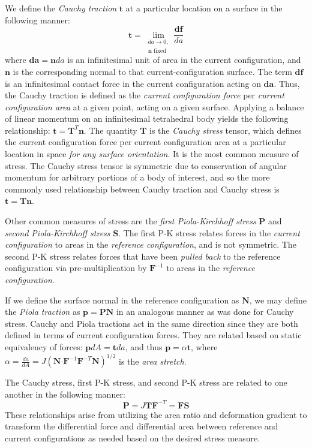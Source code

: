 We define the \textit{Cauchy traction} $\bm{t}$ at a particular location on a surface in the following manner:
\begin{equation}
\bm{t} = \lim_{\substack{{da} \rightarrow 0, \\ {\bm{n} \text{\ fixed}}}} \frac{{\bm{df}}}{da}
\end{equation}
where $\bm{da} = \bm{n}da$ is an infinitesimal unit of area in the current configuration, and $\bm{n}$ is the corresponding normal to that current-configuration surface. The term $\bm{df}$ is an infinitesimal contact force in the current configuration acting on $\bm{da}$. Thus, the Cauchy traction is defined as the \textit{current configuration force} per \textit{current configuration area} at a given point, acting on a given surface. Applying a balance of linear momentum on an infinitesimal tetrahedral body yields the following relationship: $\bm{t} = \bm{T}^T\bm{n}$. The quantity $\bm{T}$ is the \textit{Cauchy stress} tensor, which defines the current configuration force per current configuration area at a particular location in space \textit{for any surface orientation}. It is the most common measure of stress. The Cauchy stress tensor is symmetric due to conservation of angular momentum for arbitrary portions of a body of interest, and so the more commonly used relationship between Cauchy traction and Cauchy stress is $\bm{t} = \bm{T}\bm{n}$.

Other common measures of stress are the \textit{first Piola-Kirchhoff stress} $\bm{P}$ and \textit{second Piola-Kirchhoff stress} $\bm{S}$. The first P-K stress relates forces in the \textit{current configuration} to areas in the \textit{reference configuration}, and is not symmetric. The second P-K stress relates forces that have been \textit{pulled back} to the reference configuration via pre-multiplication by $\bm{F}^{-1}$ to areas in the \textit{reference configuration}.

If we define the surface normal in the reference configuration as $\bm{N}$, we may define the \textit{Piola traction} as $\bm{p} = \bm{P}\bm{N}$ in an analogous manner as was done for Cauchy stress. Cauchy and Piola tractions act in the same direction since they are both defined in terms of current configuration forces. They are related based on static equivalency of forces: $\bm{p}dA = \bm{t}da$, and thus $\bm{p} = \alpha\bm{t}$, where $\alpha = \frac{da}{dA} = J\left(\bm{N} \bm{\cdot} \bm{F}^{-1}\bm{F}^{-T}\bm{N}\right)^{1/2}$ is the \textit{area stretch}.

The Cauchy stress, first P-K stress, and second P-K stress are related to one another in the following manner:
\begin{equation}
\bm{P} = J\bm{T}\bm{F}^{-T} = \bm{F}\bm{S}
\end{equation}
These relationships arise from utilizing the area ratio and deformation gradient to transform the differential force and differential area between reference and current configurations as needed based on the desired stress measure.

